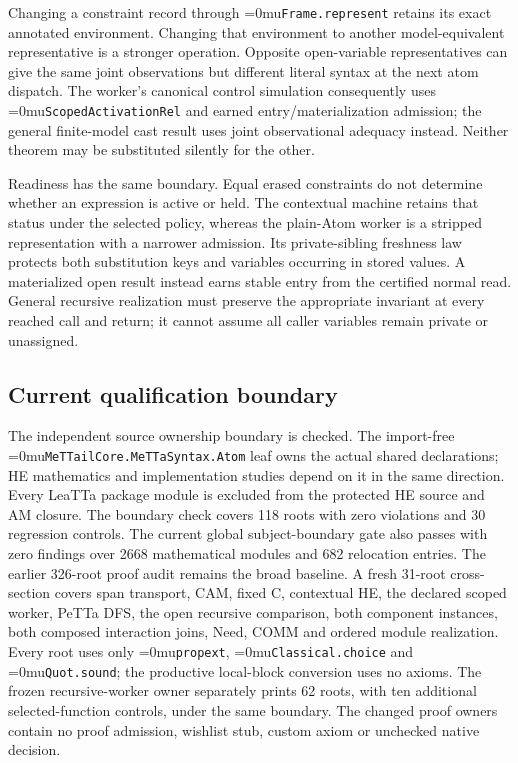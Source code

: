 \documentclass[11pt,a4paper]{article}
\newcommand{\name}[1]{\textup{\Urlmuskip=0mu\relax\nolinkurl{#1}}}
\begin{document}
Changing a constraint record through \name{Frame.represent} retains its exact
annotated environment. Changing that environment to another model-equivalent
representative is a stronger operation. Opposite open-variable representatives
can give the same joint observations but different literal syntax at the next
atom dispatch. The worker's canonical control simulation consequently uses
\name{ScopedActivationRel} and earned entry/materialization admission; the
general finite-model cast result uses joint observational adequacy instead.
Neither theorem may be substituted silently for the other.

Readiness has the same boundary. Equal erased constraints do not determine
whether an expression is active or held. The contextual machine retains that
status under the selected policy, whereas the plain-Atom worker is a stripped
representation with a narrower admission. Its private-sibling freshness law
protects both substitution keys and variables occurring in stored values.
A materialized open result instead earns stable entry from the certified
normal read. General recursive realization must preserve the appropriate
invariant at every reached call and return; it cannot assume all caller
variables remain private or unassigned.

\subsection*{Current qualification boundary}

The independent source ownership boundary is checked. The import-free
\name{MeTTailCore.MeTTaSyntax.Atom} leaf owns the actual shared declarations;
HE mathematics and implementation studies depend on it in the same direction.
Every LeaTTa package module is excluded from the protected HE source and AM
closure. The boundary check covers 118 roots with zero violations and 30
regression controls. The current global subject-boundary gate also passes
with zero findings over 2668 mathematical modules and 682 relocation entries.
The earlier 326-root proof audit remains the broad baseline. A fresh 31-root
cross-section covers span transport, CAM, fixed C, contextual HE, the declared
scoped worker, PeTTa DFS, the open recursive comparison, both component
instances, both composed interaction joins, Need, COMM and ordered module
realization. Every root uses only \name{propext}, \name{Classical.choice} and
\name{Quot.sound}; the productive local-block conversion uses no axioms. The
frozen recursive-worker owner separately prints 62 roots, with ten additional
selected-function controls, under the same boundary. The changed proof owners
contain no proof admission, wishlist stub, custom axiom or unchecked native
decision.
\end{document}
